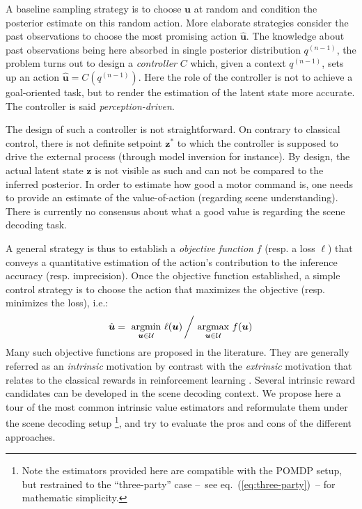 \documentclass[12pt,twoside,openright]{article}
\begin{document}
A baseline sampling strategy is to choose $\boldsymbol{u}$ at random and condition the posterior  estimate on this random action. 
More elaborate strategies consider the past observations
to choose the most promising action $\hat{\boldsymbol{u}}$. %
The knowledge about past observations being here absorbed in single posterior distribution $q^{(n-1)}$, the problem turns out to design  a \emph{controller} $C$ which, given a context $q^{(n-1)}$, sets up an action $\hat{\boldsymbol{u}} = C(q^{(n-1)})$. Here the role of the controller is not to achieve a goal-oriented task, but to render the estimation of the latent state more accurate. The controller is said \emph{perception-driven}. 

The design of such a controller is not straightforward. On contrary to classical control, there is not definite setpoint $\boldsymbol{z}^*$ to which the controller is supposed to drive the external process (through model inversion for instance). By design, the actual latent state $\boldsymbol{z}$ is not visible as such and can not be compared to the inferred posterior. In order to estimate how good a motor command is, one needs to provide an estimate of the value-of-action (regarding scene understanding). There is currently no consensus about what a good value is regarding the scene decoding task. 

A general strategy is thus to establish a \emph{objective function} $f$ (resp. a loss $\ell$) that conveys a quantitative estimation of the action's contribution to the inference accuracy (resp. imprecision). Once the objective function established, a simple control strategy is to choose the action that maximizes the objective (resp. minimizes the loss), i.e.:
\begin{align}
\hat{\boldsymbol{u}} = \underset{\boldsymbol{u}\in\mathcal{U}}{\text{ argmin }}  \ell(\boldsymbol{u})\left/ \underset{\boldsymbol{u}\in\mathcal{U}}{\text{ argmax }}  f(\boldsymbol{u})\right.
\end{align}
Many such objective functions are proposed in the literature. They are generally referred as an \emph{intrinsic} motivation \cite{oudeyer2008can} by contrast with the \emph{extrinsic} motivation that relates to the classical rewards in reinforcement learning \cite{sutton1998reinforcement}. Several intrinsic reward candidates can be developed in the scene decoding context.
We propose here a tour of the most common intrinsic value estimators and reformulate them under the scene decoding setup \footnote{Note the estimators provided here are compatible with the POMDP setup, but restrained to the ``three-party'' case --~see eq.~(\ref{eq:three-party})~-- for mathematic simplicity.}, and try to evaluate the pros and cons of the different approaches.
\end{document}
